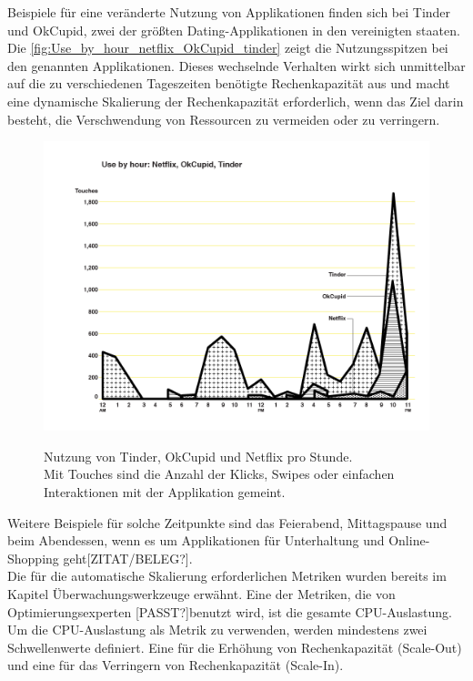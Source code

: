 Beispiele für eine veränderte Nutzung von Applikationen finden sich bei Tinder und OkCupid, zwei der größten Dating-Applikationen in den vereinigten staaten. Die \autoref{fig:Use_by_hour_netflix_OkCupid_tinder} zeigt die Nutzungsspitzen bei den genannten Applikationen. Dieses wechselnde Verhalten wirkt sich unmittelbar auf die zu verschiedenen Tageszeiten benötigte Rechenkapazität aus und macht eine dynamische Skalierung der Rechenkapazität erforderlich, wenn das Ziel darin besteht, die Verschwendung von Ressourcen zu vermeiden oder zu verringern. 
\begin{figure}[h!]
  \centering
  \includegraphics[scale=0.33]{sources/Use_by_hour_netflix_OkCupid_tinder}
  \caption[Nutzung von Tinder, OkCupid und Netflix pro Stunde]{}\label{fig:Use_by_hour_netflix_OkCupid_tinder} Nutzung von Tinder, OkCupid und Netflix pro Stunde.  
  {\cite{SCOUT1}}
  \\Mit Touches sind die Anzahl der Klicks, Swipes oder einfachen Interaktionen mit der Applikation gemeint.
\end{figure}

Weitere Beispiele für solche Zeitpunkte sind das Feierabend, Mittagspause und beim Abendessen, wenn es um Applikationen für Unterhaltung und Online-Shopping geht[ZITAT/BELEG?].
\\
Die für die automatische Skalierung erforderlichen Metriken wurden bereits im Kapitel Überwachungswerkzeuge erwähnt. Eine der Metriken, die von Optimierungsexperten [PASST?]benutzt wird, ist die gesamte CPU-Auslastung. 
Um die CPU-Auslastung als Metrik zu verwenden, werden mindestens zwei Schwellenwerte definiert. Eine für die Erhöhung von Rechenkapazität (Scale-Out) und eine für das Verringern von Rechenkapazität (Scale-In).


